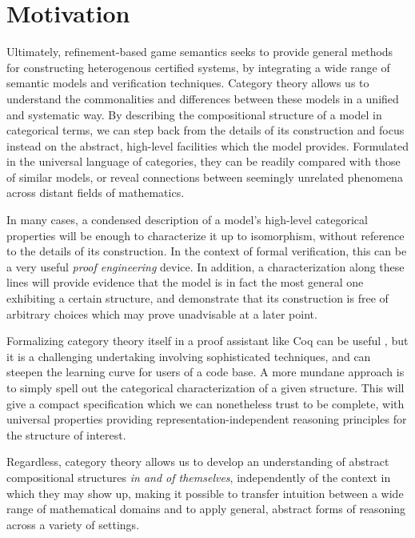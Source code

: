\documentclass[11pt,oneside,draft]{book}
\theoremstyle{definition}
\begin{document}

\section{Motivation} %

Ultimately,
refinement-based game semantics seeks
to provide general methods for
constructing heterogenous certified systems,
by integrating a wide range of
semantic models and verification techniques.
Category theory allows us to
understand the commonalities and differences
between these models
in a unified and systematic way.
By describing the compositional structure of a model
in categorical terms,
we can step back from the details of its construction
and focus instead on
the abstract, high-level facilities which the model provides.
Formulated
in the universal language of categories,
they can be readily compared with those of similar models,
or reveal connections between
seemingly unrelated phenomena across
distant fields of mathematics.

In many cases,
a condensed description of
a model's high-level categorical properties
will be enough to characterize it
up to isomorphism,
without reference to the details of its construction.
In the context of formal verification,
this can be a very useful \emph{proof engineering} device.
In addition,
a characterization along these lines
will provide evidence that
the model is in fact the most general one
exhibiting a certain structure,
and demonstrate that its construction is free of arbitrary choices
which may prove unadvisable at a later point.

Formalizing category theory itself
in a proof assistant like Coq
can be useful \citep{math-classes},
but it is a challenging undertaking
involving sophisticated techniques,
and can steepen the learning curve
for users of a code base.
A more mundane approach
is to simply spell out
the categorical characterization of a given structure.
This will give a compact specification
which we can nonetheless trust to be complete,
with universal properties 
providing
representation-independent reasoning principles
for the structure of interest.

Regardless,
category theory allows us
to develop an understanding of abstract compositional structures
\emph{in and of themselves},
independently of the context in which they may show up,
making it possible to transfer intuition between
a wide range of mathematical domains
and to apply general, abstract forms of reasoning
across a variety of settings.
\end{document}
